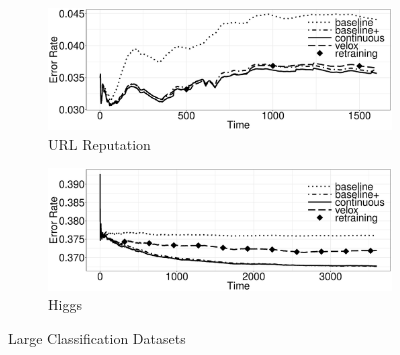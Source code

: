 \documentclass{vldb}
\begin{document}
\begin{figure}[h]
	\centering
\begin{subfigure}[b]{\columnwidth}
	\includegraphics[width=\columnwidth,height=0.4\columnwidth]{../images/experiment-results/url-reputation-quality.eps}
	\caption{URL Reputation}
	\label{fig:url-quality}
\end{subfigure}
\begin{subfigure}[b]{\columnwidth}
  	\includegraphics[width=\columnwidth,height=0.4\columnwidth]{../images/experiment-results/higgs-quality.eps}
	\caption{Higgs}
	\label{fig:higgs-quality}
\end{subfigure}
\vspace{2mm}
\caption{Large Classification Datasets}
\label{fig:cluster-classification-results}
\end{figure}
\end{document}
